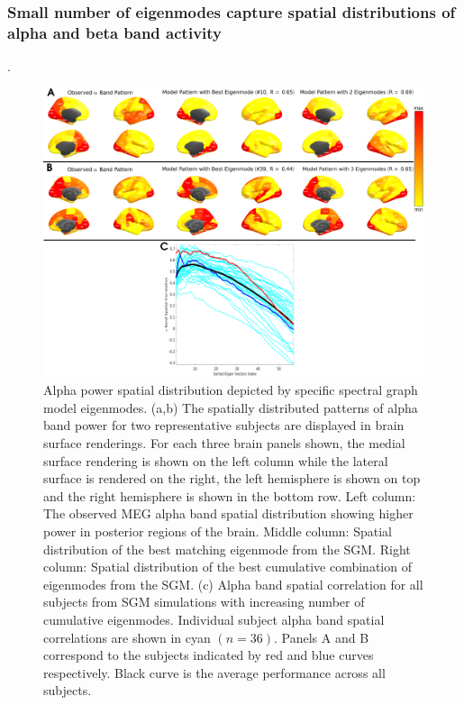 \subsubsection{Small number of eigenmodes capture spatial distributions of
alpha and beta band activity}.

\begin{figure}[htbp]
    \centering
    \includegraphics[width=\textwidth]{../figures/chapter5/fig5_alpha.png}
    \caption{Alpha power spatial distribution depicted by specific spectral graph model eigenmodes. (a,b) The spatially distributed patterns of alpha band power for two representative subjects are displayed in brain surface renderings. For each three brain panels shown, the medial surface rendering is shown on the left column while the lateral surface is rendered on the right, the left hemisphere is shown on top and the right hemisphere is shown in the bottom row. Left column: The observed MEG alpha band spatial distribution showing higher power in posterior regions of the brain. Middle column: Spatial distribution of the best matching eigenmode from the SGM. Right column: Spatial distribution of the best cumulative combination of eigenmodes from the SGM. (c) Alpha band spatial correlation for all subjects from SGM simulations with increasing number of cumulative eigenmodes. Individual subject alpha band spatial correlations are shown in cyan $(n=36)$. Panels A and B correspond to the subjects indicated by red and blue curves respectively. Black curve is the average performance across all subjects.}
    \label{fig:alpha}
\end{figure}

